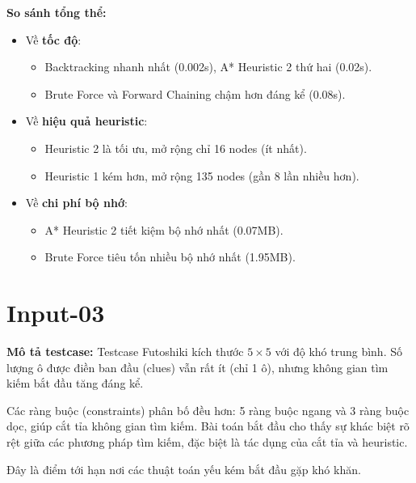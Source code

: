 \textbf{So sánh tổng thể:}

\begin{itemize}
    \item Về \textbf{tốc độ}:
    \begin{itemize}
        \item Backtracking nhanh nhất (0.002s), A* Heuristic 2 thứ hai (0.02s).
        \item Brute Force và Forward Chaining chậm hơn đáng kể (0.08s).
    \end{itemize}
    
    \item Về \textbf{hiệu quả heuristic}:
    \begin{itemize}
        \item Heuristic 2 là tối ưu, mở rộng chỉ 16 nodes (ít nhất).
        \item Heuristic 1 kém hơn, mở rộng 135 nodes (gần 8 lần nhiều hơn).
    \end{itemize}
    
    \item Về \textbf{chi phí bộ nhớ}:
    \begin{itemize}
        \item A* Heuristic 2 tiết kiệm bộ nhớ nhất (0.07MB).
        \item Brute Force tiêu tốn nhiều bộ nhớ nhất (1.95MB).
    \end{itemize}
\end{itemize}


\section{Input-03}
\textbf{Mô tả testcase:}
Testcase Futoshiki kích thước $5 \times 5$ với độ khó trung bình. Số lượng ô được điền ban đầu (clues) vẫn rất ít (chỉ 1 ô), nhưng không gian tìm kiếm bắt đầu tăng đáng kể.

Các ràng buộc (constraints) phân bố đều hơn: 5 ràng buộc ngang và 3 ràng buộc dọc, giúp cắt tỉa không gian tìm kiếm. Bài toán bắt đầu cho thấy sự khác biệt rõ rệt giữa các phương pháp tìm kiếm, đặc biệt là tác dụng của cắt tỉa và heuristic.

Đây là điểm tới hạn nơi các thuật toán yếu kém bắt đầu gặp khó khăn.

